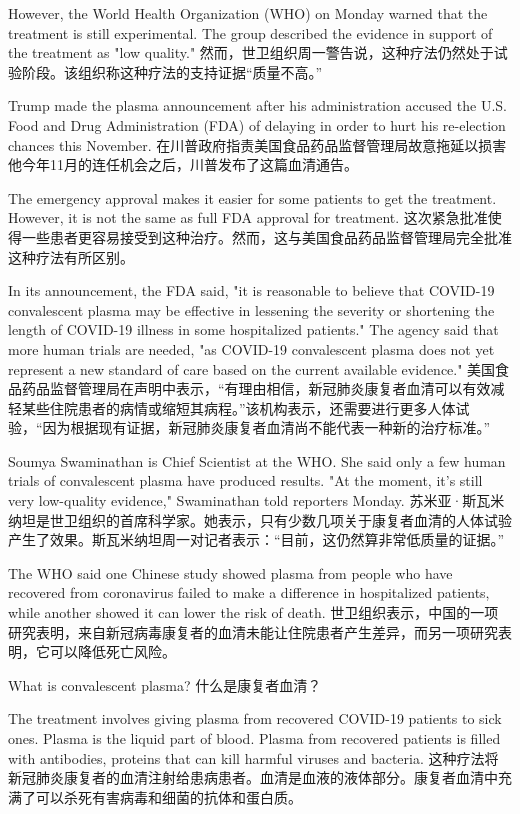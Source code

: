 However, the World Health Organization (WHO) on Monday warned that the treatment is still experimental. The group described the evidence in support of the treatment as "low quality."
然而，世卫组织周一警告说，这种疗法仍然处于试验阶段。该组织称这种疗法的支持证据“质量不高。”

Trump made the plasma announcement after his administration accused the U.S. Food and Drug Administration (FDA) of delaying in order to hurt his re-election chances this November.
在川普政府指责美国食品药品监督管理局故意拖延以损害他今年11月的连任机会之后，川普发布了这篇血清通告。

The emergency approval makes it easier for some patients to get the treatment. However, it is not the same as full FDA approval for treatment.
这次紧急批准使得一些患者更容易接受到这种治疗。然而，这与美国食品药品监督管理局完全批准这种疗法有所区别。

In its announcement, the FDA said, "it is reasonable to believe that COVID-19 convalescent plasma may be effective in lessening the severity or shortening the length of COVID-19 illness in some hospitalized patients." The agency said that more human trials are needed, "as COVID-19 convalescent plasma does not yet represent a new standard of care based on the current available evidence."
美国食品药品监督管理局在声明中表示，“有理由相信，新冠肺炎康复者血清可以有效减轻某些住院患者的病情或缩短其病程。”该机构表示，还需要进行更多人体试验，“因为根据现有证据，新冠肺炎康复者血清尚不能代表一种新的治疗标准。”

Soumya Swaminathan is Chief Scientist at the WHO. She said only a few human trials of convalescent plasma have produced results. "At the moment, it's still very low-quality evidence," Swaminathan told reporters Monday.
苏米亚·斯瓦米纳坦是世卫组织的首席科学家。她表示，只有少数几项关于康复者血清的人体试验产生了效果。斯瓦米纳坦周一对记者表示：“目前，这仍然算非常低质量的证据。”

The WHO said one Chinese study showed plasma from people who have recovered from coronavirus failed to make a difference in hospitalized patients, while another showed it can lower the risk of death.
世卫组织表示，中国的一项研究表明，来自新冠病毒康复者的血清未能让住院患者产生差异，而另一项研究表明，它可以降低死亡风险。

What is convalescent plasma?
什么是康复者血清？

The treatment involves giving plasma from recovered COVID-19 patients to sick ones. Plasma is the liquid part of blood. Plasma from recovered patients is filled with antibodies, proteins that can kill harmful viruses and bacteria.
这种疗法将新冠肺炎康复者的血清注射给患病患者。血清是血液的液体部分。康复者血清中充满了可以杀死有害病毒和细菌的抗体和蛋白质。

